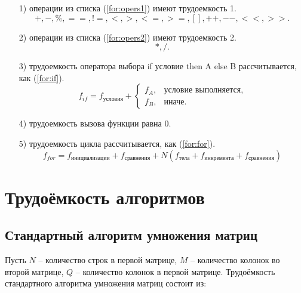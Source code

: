 \documentclass[12pt]{report}
\begin{document}
	\begin{enumerate}
		\item[1)] операции из списка (\ref{for:opers1}) имеют трудоемкость 1.
		\begin{equation}
		\label{for:opers1}
		+, -, \%, ==, !=, <, >, <=, >=, [], ++, {-}-, {<}<, {>}>.
		\end{equation}
		\item[2)] операции из списка (\ref{for:opers2}) имеют трудоемкость 2.
		\begin{equation}
		\label{for:opers2}
		*, /.
		\end{equation}
		\item[3)] трудоемкость оператора выбора if условие then A else B рассчитывается, как (\ref{for:if}).
		\begin{equation}
		\label{for:if}
		f_{if} = f_{\text{условия}} +
		\begin{cases}
		f_A, & \text{условие выполняется,}\\
		f_B, & \text{иначе.}
		\end{cases}
		\end{equation}
		\item[4)] трудоемкость вызова функции равна 0.
		\item[5)] трудоемкость цикла рассчитывается, как (\ref{for:for}).
		\begin{equation}
		\label{for:for}
		f_{for} = f_{\text{инициализации}} + f_{\text{сравнения}} + N(f_{\text{тела}} + f_{\text{инкремента}} + f_{\text{сравнения}})
		\end{equation}
	\end{enumerate}
	
	\section{Трудоёмкость алгоритмов}
	
	\subsection{Стандартный алгоритм умножения матриц}
	
	Пусть $N$ -- количество строк в первой матрице, $M$ -- количество колонок во второй матрице, $Q$ -- количество колонок в первой матрице.
	Трудоёмкость стандартного алгоритма умножения матриц состоит из:\newline\newline\newline\newline\newline\newline
	
\end{document}
